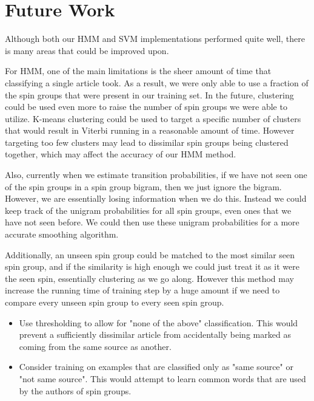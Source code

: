 \documentclass[11pt,letterpaper,oneside, titlepage]{scrartcl}
\begin{document}
\section{Future Work}
Although both our HMM and SVM implementations performed quite well, there is many areas that could be improved upon.

For HMM, one of the main limitations is the sheer amount of time that classifying a single article took. As a result, we were only able to use a fraction of the spin groups that were present in our training set. In the future, clustering could be used even more to raise the number of spin groups we were able to utilize. K-means clustering could be used to target a specific number of clusters that would result in Viterbi running in a reasonable amount of time. However targeting too few clusters may lead to dissimilar spin groups being clustered together, which may affect the accuracy of our HMM method.

Also, currently when we estimate transition probabilities, if we have not seen one of the spin groups in a spin group bigram, then we just ignore the bigram. However, we are essentially losing information when we do this. Instead we could keep track of the unigram probabilities for all spin groups, even ones that we have not seen before. We could then use these unigram probabilities for a more accurate smoothing algorithm. 

Additionally, an unseen spin group could be matched to the most similar seen spin group, and if the similarity is high enough we could just treat it as it were the seen spin, essentially clustering as we go along. However this method may increase the running time of training step by a huge amount if we need to compare every unseen spin group to every seen spin group.
 
\begin{itemize}

\item Use thresholding to allow for "none of the above" classification.  This would prevent a sufficiently dissimilar article from accidentally being marked as coming from the same source as another.

\item Consider training on examples that are classified only as "same source" or "not same source".  This would attempt to learn common words that are used by the authors of spin groups.

\end{itemize}
\end{document}
